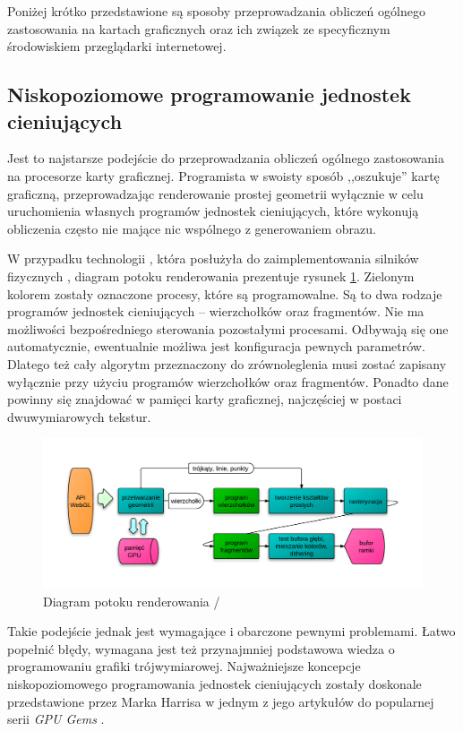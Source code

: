 Poniżej krótko przedstawione są sposoby przeprowadzania obliczeń ogólnego
zastosowania na kartach graficznych oraz ich związek ze specyficznym
środowiskiem przeglądarki internetowej.

\subsection{Niskopoziomowe programowanie jednostek cieniujących}
\label{subsec:niskProgJedn}

Jest to najstarsze podejście do przeprowadzania obliczeń ogólnego zastosowania
na procesorze karty graficznej. Programista w swoisty sposób ,,oszukuje'' kartę
graficzną, przeprowadzając renderowanie prostej geometrii wyłącznie w celu
uruchomienia własnych programów jednostek cieniujących, które wykonują
obliczenia często nie mające nic wspólnego z generowaniem obrazu.

W przypadku technologii , która posłużyła do zaimplementowania
silników fizycznych \en, diagram potoku renderowania prezentuje rysunek
\ref{fig:WebGLPipeline}. Zielonym kolorem zostały oznaczone procesy, które są
programowalne. Są to dwa rodzaje programów jednostek cieniujących --
wierzchołków oraz fragmentów. Nie ma możliwości bezpośredniego sterowania
pozostałymi procesami. Odbywają się one automatycznie, ewentualnie możliwa jest
konfiguracja pewnych parametrów. Dlatego też cały algorytm przeznaczony do
zrównoleglenia musi zostać zapisany wyłącznie przy użyciu programów wierzchołków
oraz fragmentów. Ponadto dane powinny się znajdować w pamięci karty graficznej,
najczęściej w postaci dwuwymiarowych tekstur.

\begin{figure}[!h]
\centering
\includegraphics[width=\textwidth]{img/WebGLPipeline}
\caption{Diagram potoku renderowania  / }
\label{fig:WebGLPipeline}
\end{figure}

Takie podejście jednak jest wymagające i obarczone pewnymi problemami. Łatwo
popełnić błędy, wymagana jest też przynajmniej podstawowa wiedza o programowaniu
grafiki trójwymiarowej. Najważniejsze koncepcje niskopoziomowego programowania
jednostek cieniujących zostały doskonale przedstawione przez Marka Harrisa w
jednym z jego artykułów do popularnej serii \emph{GPU Gems} \cite{GPUConcepts}.

